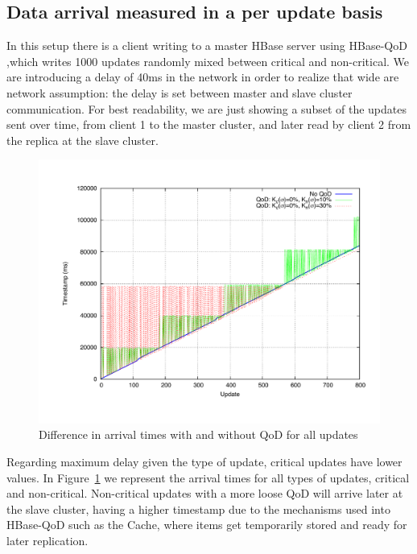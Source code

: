 \subsection{Data arrival measured in a per update basis}
In this setup there is a client writing to a master HBase server using HBase-QoD ,which writes 1000 updates randomly mixed between critical and non-critical. We are introducing a delay of 40ms in the network in order to realize that wide are network assumption: the delay is set between master and slave cluster communication. For best readability, we are just showing a subset of the updates sent over time, from client 1 to the master cluster, and later read by client 2 from the replica at the slave cluster.

\begin{figure}[b]
\centering
\includegraphics[width=1.0\textwidth]{figs/portion-criticalvsnon-timestamps.pdf}
\caption{Difference in arrival times with and without QoD for all updates}
\label{fig-baseline-critical-vs-non-critical}
\end{figure}

Regarding maximum delay given the type of update, critical updates have lower values. In Figure~\ref{fig-baseline-critical-vs-non-critical} we represent the arrival times for all types of updates, critical and non-critical. Non-critical updates with a more loose QoD will arrive later at the slave cluster, having a higher timestamp due to the mechanisms used into HBase-QoD such as the Cache, where items get temporarily stored and ready for later replication.


